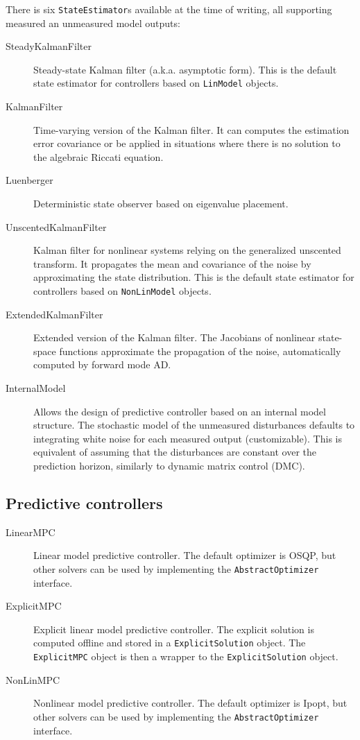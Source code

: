 There is six \texttt{StateEstimator}s available at the time of writing, all supporting measured an unmeasured model outputs:
\begin{description}
    \item[SteadyKalmanFilter] Steady-state Kalman filter (a.k.a. asymptotic form). This is the default state estimator for controllers based on \texttt{LinModel} objects.
    \item[KalmanFilter] Time-varying version of the Kalman filter. It can computes the estimation error covariance or be applied in situations where there is no solution to the algebraic Riccati equation.
    \item[Luenberger] Deterministic state observer based on eigenvalue placement.
    \item[UnscentedKalmanFilter] Kalman filter for nonlinear systems relying on the generalized unscented transform. It propagates the mean and covariance of the noise by approximating the state distribution. This is the default state estimator for controllers based on \texttt{NonLinModel} objects.
    \item[ExtendedKalmanFilter] Extended version of the Kalman filter. The Jacobians of nonlinear state-space functions approximate the propagation of the noise, automatically computed by forward mode AD.
    \item[InternalModel] Allows the design of predictive controller based on an internal model structure. The stochastic model of the unmeasured disturbances defaults to integrating white noise for each measured output (customizable). This is equivalent of assuming that the disturbances are constant over the prediction horizon, similarly to dynamic matrix control (DMC).
\end{description}

\subsection{Predictive controllers}

\begin{description}
    \item[LinearMPC] Linear model predictive controller. The default optimizer is OSQP, but other solvers can be used by implementing the \texttt{AbstractOptimizer} interface.
    \item[ExplicitMPC] Explicit linear model predictive controller. The explicit solution is computed offline and stored in a \texttt{ExplicitSolution} object. The \texttt{ExplicitMPC} object is then a wrapper to the \texttt{ExplicitSolution} object.
    \item[NonLinMPC] Nonlinear model predictive controller. The default optimizer is Ipopt, but other solvers can be used by implementing the \texttt{AbstractOptimizer} interface. 
\end{description}

